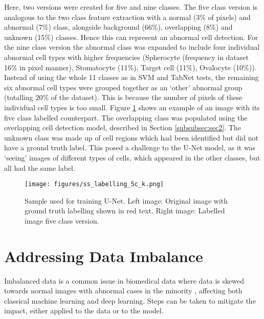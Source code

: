 \documentclass[final,5p,times,twocolumn,authoryear]{elsarticle}
\begin{document}
Here, two versions were created for five and nine classes. The five class version is analogous to the two class feature extraction with a normal (3\% of pixels) and abnormal (7\%) class, alongside background (66\%), overlapping (8\%) and unknown (15\%) classes. Hence this can represent an abnormal cell detection. For the nine class version the abnormal class was expanded to include four individual abnormal cell types with higher frequencies (Spherocyte (frequency in dataset 16\% in pixel manner), Stomatocyte (11\%), Target cell (11\%), Ovalocyte (10\%)).  Instead of using the whole 11 classes as in SVM and TabNet tests, the remaining six abnormal cell types were grouped together as an ‘other’ abnormal group (totalling 20\% of the dataset).
This is because the number of pixels of these individual cell types is too small. Figure \ref{fig:sslab5c} shows an example of an image with its five class labelled counterpart. The overlapping class was populated using the overlapping cell detection model, described in Section \ref{subsubsec:sec2}. The unknown class was made up of cell regions which had been identified but did not have a ground truth label. This posed a challenge to the U-Net model, as it was `seeing' images of different types of cells, which appeared in the other classes, but all had the same label. 

\begin{figure}[t!]
	\centering
	\texttt{[image: figures/ss\_labelling\_5c\_k.png]}
	\caption[Ground truth labelling]{Sample used for training U-Net. Left image: Original image with ground truth labelling shown in red text. Right image: Labelled image five class version.}
	\label{fig:sslab5c}
\end{figure}



\section{Addressing Data Imbalance}
\label{sec:dataimb}

Imbalanced data is a common issue in biomedical data where data is skewed towards normal images with abnormal cases in the minority \citep{Gupta2019DeepReview}, affecting both classical machine learning and deep learning. Steps can be taken to mitigate the impact, either applied to the data or to the model. 
\end{document}
